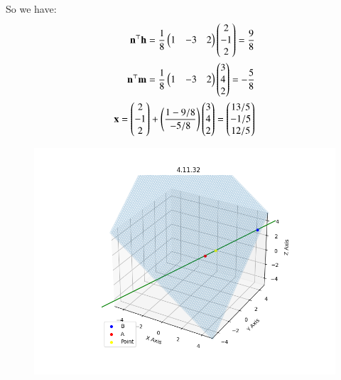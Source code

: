 \documentclass[journal,12pt,onecolumn]{IEEEtran}
\theoremstyle{remark}
\begin{document}
So we have:
\begin{align}
\mathbf{n}^\top\mathbf{h}= \frac{1}{8}\begin{pmatrix}1&-3&2\end{pmatrix}\begin{pmatrix}2\\-1\\2\end{pmatrix} = \frac{9}{8}\\
\mathbf{n}^\top\mathbf{m} = \frac{1}{8}\begin{pmatrix}1&-3&2\end{pmatrix}\begin{pmatrix}3\\4\\2\end{pmatrix} = -\frac{5}{8} \\
\mathbf{x} = \begin{pmatrix}2\\-1\\2\end{pmatrix} + \left(\frac{1-9/8}{-5/8}\right)
\begin{pmatrix}3\\4\\2\end{pmatrix} = \begin{pmatrix}13/5\\-1/5\\12/5 \end{pmatrix}
\end{align}
\begin{figure}[H]
    \centering
    \includegraphics{figs/plot.png}
    \caption*{}
    \label{fig:plot}
\end{figure}
\end{document}
